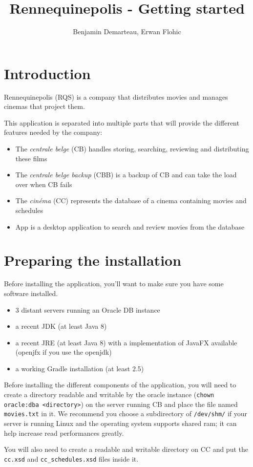 \documentclass[a4paper]{article}
\title{Rennequinepolis - Getting started}
\author{Benjamin Demarteau, Erwan Flohic}
\begin{document}
\maketitle

\newpage
\renewcommand*\contentsname{Table of contents}

\tableofcontents

\newpage
\section{Introduction}

Rennequinepolis (RQS) is a company that distributes movies and manages cinemas that project them.\par
This application is separated into multiple parts that will provide the different features needed by the company:
\begin{itemize}
	\item The \emph{centrale belge} (CB) handles storing, searching, reviewing and distributing these films
	\item The \emph{centrale belge backup} (CBB) is a backup of CB and can take the load over when CB fails
	\item The \emph{cinéma} (CC) represents the database of a cinema containing movies and schedules
	\item App is a desktop application to search and review movies from the database
\end{itemize}

\section{Preparing the installation}

Before installing the application, you'll want to make sure you have some software installed.
\begin{itemize}
	\item 3 distant servers running an Oracle DB instance
	\item a recent JDK (at least Java 8)
	\item a recent JRE (at least Java 8) with a implementation of JavaFX available (openjfx if you use the openjdk)
	\item a working Gradle installation (at least 2.5)
\end{itemize}

Before installing the different components of the application, you will need to create a directory readable and writable by the oracle instance (\texttt{chown oracle:dba <directory>}) on the server running CB and place the file named \texttt{movies.txt} in it. We recommend you choose a subdirectory of \texttt{/dev/shm/} if your server is running Linux and the operating system supports shared ram; it can help increase read performances greatly.
\par
You will also need to create a readable and writable directory on CC and put the \texttt{cc.xsd} and \texttt{cc\_schedules.xsd} files inside it.
\end{document}
